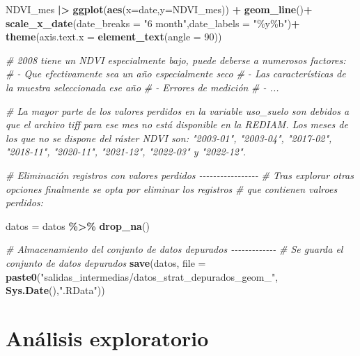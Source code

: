 \documentclass[12pt,a4paper,]{book}
\newenvironment{Shaded}{\begin{snugshade}}{\end{snugshade}}
\newcommand{\AttributeTok}[1]{\textcolor[rgb]{0.13,0.29,0.53}{#1}}
\newcommand{\CommentTok}[1]{\textcolor[rgb]{0.56,0.35,0.01}{\textit{#1}}}
\newcommand{\DecValTok}[1]{\textcolor[rgb]{0.00,0.00,0.81}{#1}}
\newcommand{\FunctionTok}[1]{\textcolor[rgb]{0.13,0.29,0.53}{\textbf{#1}}}
\newcommand{\NormalTok}[1]{#1}
\newcommand{\OtherTok}[1]{\textcolor[rgb]{0.56,0.35,0.01}{#1}}
\newcommand{\SpecialCharTok}[1]{\textcolor[rgb]{0.81,0.36,0.00}{\textbf{#1}}}
\newcommand{\StringTok}[1]{\textcolor[rgb]{0.31,0.60,0.02}{#1}}
\numberwithin{dummy}{section}
\theoremstyle{ocrenumbox}
\theoremstyle{blacknumex}
\theoremstyle{blacknumbox}
\theoremstyle{ocrenum}
\theoremstyle{ocrenum}
\begin{document}
\begin{Shaded}
\begin{Highlighting}[]
\NormalTok{NDVI\_mes }\SpecialCharTok{|\textgreater{}} 
  \FunctionTok{ggplot}\NormalTok{(}\FunctionTok{aes}\NormalTok{(}\AttributeTok{x=}\NormalTok{date,}\AttributeTok{y=}\NormalTok{NDVI\_mes)) }\SpecialCharTok{+}
  \FunctionTok{geom\_line}\NormalTok{()}\SpecialCharTok{+}
  \FunctionTok{scale\_x\_date}\NormalTok{(}\AttributeTok{date\_breaks =} \StringTok{"6 month"}\NormalTok{,}\AttributeTok{date\_labels =} \StringTok{"\%y\%b"}\NormalTok{)}\SpecialCharTok{+}
  \FunctionTok{theme}\NormalTok{(}\AttributeTok{axis.text.x =} \FunctionTok{element\_text}\NormalTok{(}\AttributeTok{angle =} \DecValTok{90}\NormalTok{))}

\CommentTok{\# 2008 tiene un NDVI especialmente bajo, puede deberse a numerosos factores:}
\CommentTok{\#   {-} Que efectivamente sea un año especialmente seco}
\CommentTok{\#   {-} Las características de la muestra seleccionada ese año}
\CommentTok{\#   {-} Errores de medición}
\CommentTok{\#   {-} ...}

\CommentTok{\# La mayor parte de los valores perdidos en la variable uso\_suelo son debidos a que el archivo tiff para ese mes no está disponible en la REDIAM. Los meses de los que no se dispone del ráster NDVI son: "2003{-}01", "2003{-}04", "2017{-}02", "2018{-}11", "2020{-}11", "2021{-}12", "2022{-}03" y "2022{-}12".}

\CommentTok{\# Eliminación registros con valores perdidos {-}{-}{-}{-}{-}{-}{-}{-}{-}{-}{-}{-}{-}{-}{-}{-}{-}}
\CommentTok{\# Tras explorar otras opciones finalmente se opta por eliminar los registros}
\CommentTok{\# que contienen valroes perdidos:}

\NormalTok{datos }\OtherTok{=}\NormalTok{ datos }\SpecialCharTok{\%\textgreater{}\%} \FunctionTok{drop\_na}\NormalTok{()}

\CommentTok{\# Almacenamiento del conjunto de datos depurados {-}{-}{-}{-}{-}{-}{-}{-}{-}{-}{-}{-}{-}}
\CommentTok{\# Se guarda el conjunto de datos depurados}
\FunctionTok{save}\NormalTok{(datos, }
     \AttributeTok{file =} \FunctionTok{paste0}\NormalTok{(}\StringTok{"salidas\_intermedias/datos\_strat\_depurados\_geom\_"}\NormalTok{,}
                   \FunctionTok{Sys.Date}\NormalTok{(),}\StringTok{".RData"}\NormalTok{))}
\end{Highlighting}
\end{Shaded}

\hypertarget{anuxe1lisis-exploratorio}{%
\section{Análisis exploratorio}\label{anuxe1lisis-exploratorio}}
\end{document}

